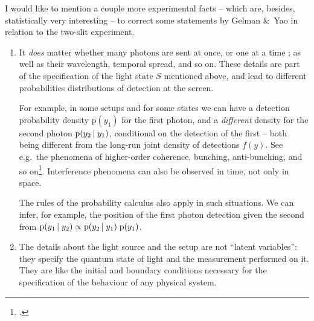 \documentclass[\ifafour a4paper,12pt,\else a5paper,10pt,\fi%
onecolumn,oneside,article,%
british%
]{memoir}
\theoremstyle{remark}
\theoremstyle{innote}
\newcommand*{\citep}{\parencites}%
\newcommand*{\amp}{\&}
\newcommand*{\pf}{\mathrm{p}}%
\renewcommand*{\|}[1][]{\nonscript\,#1\vert\nonscript\;\mathopen{}}
\newcommand*{\sect}{\S}%
\newcommand*{\eg}{{e.g.}}
\newcommand*{\cf}{{cf.}}
\begin{document}
I would like to mention a couple more experimental facts -- which are,
besides, statistically very interesting -- to correct some statements by
Gelman \amp\ Yao in relation to the two-slit experiment.

\begin{enumerate}[label=(\textbf{\roman*})]
\item\label{item:q_details} It \emph{does} matter whether many photons are
  sent at once, or one at a time \citep[\cf][\sect~2
  point~1]{gelmanetal2020}; as well as their wavelength, temporal spread,
  and so on. These details are part of the specification of the light state
  $S$ mentioned above, and lead to different probabilities distributions of
  detection at the screen.

  For example, in some setups and for some states we can have a detection
  probability density $\pf(y_{1})$ for the first photon, and a
  \emph{different} density for the second photon $\pf(y_{2} \| y_{1})$,
  conditional on the detection of the first -- both being different from
  the long-run joint density of detections $f(y)$. See \eg\ the phenomena
  of higher-order coherence, bunching, anti-bunching, and so
  on\footcites[\eg][]{mandeletal1965,morganetal1966,paul1982,jacobsonetal1995}[and
  textbooks such
  as][]{loudon1973_r2000,mandeletal1995_r2008,scullyetal1997_r2001,bachoretal1998_r2004,wallsetal1994}.
  Interference phenomena can also be observed in time, not only in space.

  The rules of the probability calculus also apply in such situations. We
  can infer, for example, the position of the first photon detection given
  the second from
  $\pf(y_{1} \| y_{2}) \propto \pf(y_{2} \| y_{1})\;\pf(y_{1})$.
  

\item\label{item:latent_vars} The details about the light source and the
  setup are not \enquote{latent variables}: they specify the quantum state
  of light and the measurement performed on it. They are like the initial
  and boundary conditions necessary for the specification of the behaviour
  of any physical system. %


\end{enumerate}
\end{document}
